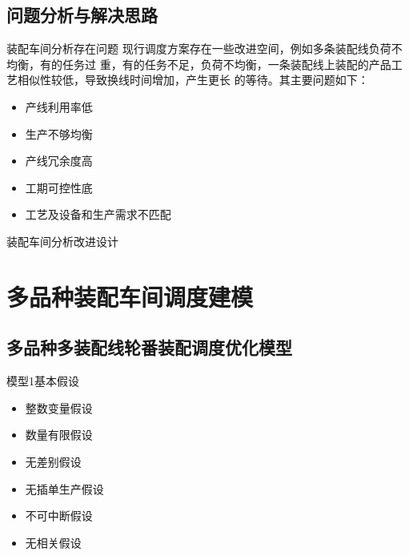 \documentclass{beamer}
\begin{document}
\subsection{问题分析与解决思路}
\begin{frame}{装配车间分析}{存在问题}
现行调度方案存在一些改进空间，例如多条装配线负荷不均衡，有的任务过
重，有的任务不足，负荷不均衡，一条装配线上装配的产品工艺相似性较低，导致换线时间增加，产生更长
的等待。其主要问题如下：
\begin{itemize}[<+-| alert@+>]
\item 产线利用率低
\item 生产不够均衡
\item 产线冗余度高
\item 工期可控性底
\item 工艺及设备和生产需求不匹配
\end{itemize}
\end{frame}
\begin{frame}{装配车间分析}{改进设计}
\end{frame}

\section{多品种装配车间调度建模}
\subsection{多品种多装配线轮番装配调度优化模型}
\begin{frame}{模型1}{基本假设}
\begin{itemize}[<+-| alert@+>]
\item 整数变量假设
\item 数量有限假设
\item 无差别假设
\item 无插单生产假设
\item 不可中断假设
\item 无相关假设
\end{itemize}
\end{frame}
\end{document}
